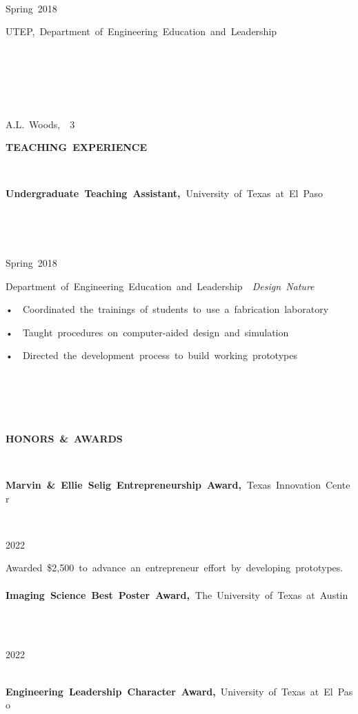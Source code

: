 \documentclass[
]{article}
\begin{document}
\textbf{~}

\textbf{~}

\textbf{~}

\textbf{~}

\textbf{~}

\textbf{~}

Spring~2018~

UTEP,~Department~of~Engineering~Education~and~Leadership~\\
\strut ~\\
\strut ~

\protect{}\label{3}{}

\protect{}\label{page3-div}
~

A.L.~Woods,~~3~

\textbf{TEACHING~EXPERIENCE~}

~

\textbf{Undergraduate~Teaching~Assistant,~}University~of~Texas~at~El~Paso~

\textbf{~}

\textbf{~}

Spring~2018~

Department~of~Engineering~Education~and~Leadership~\textbar~\emph{Design~Nature}~

•~~Coordinated~the~trainings~of~students~to~use~a~fabrication~laboratory~

•~~Taught~procedures~on~computer-aided~design~and~simulation~~

•~~Directed~the~development~process~to~build~working~prototypes~

~\\
\strut ~\\
\strut ~\\
\textbf{HONORS~\&~AWARDS~}

~

\textbf{Marvin~\&~Ellie~Selig~Entrepreneurship~Award,~}Texas~Innovation~Center\textbf{~}

\textbf{~}

2022~

Awarded~\$2,500~to~advance~an~entrepreneur~effort~by~developing~prototypes.~\\
\textbf{~\\
Imaging~Science~Best~Poster~Award,~}The~University~of~Texas~at~Austin~~

~

2022~

\textbf{~\\
Engineering~Leadership~Character~Award,}~University~of~Texas~at~El~Paso~
\end{document}
